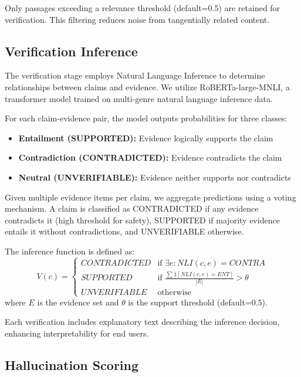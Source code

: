 \documentclass[conference]{IEEEtran}
\begin{document}
Only passages exceeding a relevance threshold (default=0.5) are retained for verification. This filtering reduces noise from tangentially related content.

\subsection{Verification Inference}

The verification stage employs Natural Language Inference to determine relationships between claims and evidence. We utilize RoBERTa-large-MNLI, a transformer model trained on multi-genre natural language inference data.

For each claim-evidence pair, the model outputs probabilities for three classes:
\begin{itemize}
\item \textbf{Entailment (SUPPORTED):} Evidence logically supports the claim
\item \textbf{Contradiction (CONTRADICTED):} Evidence contradicts the claim
\item \textbf{Neutral (UNVERIFIABLE):} Evidence neither supports nor contradicts
\end{itemize}

Given multiple evidence items per claim, we aggregate predictions using a voting mechanism. A claim is classified as CONTRADICTED if any evidence contradicts it (high threshold for safety), SUPPORTED if majority evidence entails it without contradictions, and UNVERIFIABLE otherwise.

The inference function is defined as:
\begin{equation}
V(c) = \begin{cases}
CONTRADICTED & \text{if } \exists e : NLI(c,e) = CONTRA \\
SUPPORTED & \text{if } \frac{\sum \mathbb{1}[NLI(c,e)=ENT]}{|E|} > \theta \\
UNVERIFIABLE & \text{otherwise}
\end{cases}
\end{equation}
where $E$ is the evidence set and $\theta$ is the support threshold (default=0.5).

Each verification includes explanatory text describing the inference decision, enhancing interpretability for end users.

\subsection{Hallucination Scoring}
\end{document}
